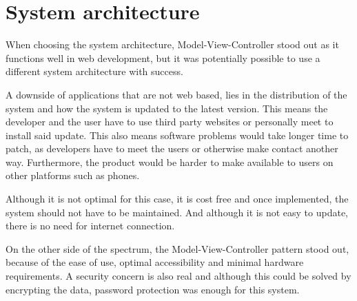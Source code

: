 \section{System architecture}	
When choosing the system architecture, Model-View-Controller stood out as it functions well in web development, but it was potentially possible to use a different system architecture with success.

A downside of applications that are not web based, lies in the distribution of the system and how the system is updated to the latest version.
This means the developer and the user have to use third party websites or personally meet to install said update.	
This also means software problems would take longer time to patch, as developers have to meet the users or otherwise make contact another way.	
Furthermore, the product would be harder to make available to users on other platforms such as phones.

Although it is not optimal for this case, it is cost free and once implemented, the system should not have to be maintained.	
And although it is not easy to update, there is no need for internet connection.	

On the other side of the spectrum, the Model-View-Controller pattern stood out, because of the ease of use, optimal accessibility and minimal hardware requirements.
A security concern is also real and although this could be solved by encrypting the data, password protection was enough for this system.
